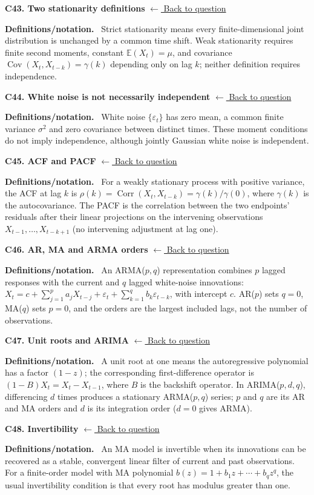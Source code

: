 \documentclass[11pt,a4paper]{article}
\newcommand{\E}{\mathbb{E}}
\newenvironment{conceptanswer}[2]
  {\par\addvspace{10pt}\noindent\begin{minipage}{\linewidth}%
   \hypertarget{concept-answer:#1}{}%
   \textcolor{statblue}{\textbf{C#1. #2}}\hfill%
   {\footnotesize\hyperlink{concept-question:#1}{$\leftarrow$ Back to question}}%
   \par\smallskip\textbf{Definitions/notation.}\ }
  {\end{minipage}\par}
\begin{document}
\begin{conceptanswer}{43}{Two stationarity definitions}
Strict stationarity means every finite-dimensional joint distribution
is unchanged by a common time shift.
Weak stationarity requires finite second moments, constant
$\E(X_t)=\mu$, and covariance
$\operatorname{Cov}(X_t,X_{t-k})=\gamma(k)$ depending only on lag $k$;
neither definition requires independence.
\end{conceptanswer}

\begin{conceptanswer}{44}{White noise is not necessarily independent}
White noise $\{\varepsilon_t\}$ has zero mean, a common finite variance
$\sigma^2$ and zero covariance between distinct times.
These moment conditions do not imply independence, although jointly
Gaussian white noise is independent.
\end{conceptanswer}

\begin{conceptanswer}{45}{ACF and PACF}
For a weakly stationary process with positive variance, the ACF at
lag $k$ is $\rho(k)=\operatorname{Corr}(X_t,X_{t-k})=\gamma(k)/\gamma(0)$,
where $\gamma(k)$ is the autocovariance.
The PACF is the correlation between the two endpoints' residuals
after their linear projections on the intervening observations
$X_{t-1},\ldots,X_{t-k+1}$ (no intervening adjustment at lag one).
\end{conceptanswer}

\begin{conceptanswer}{46}{AR, MA and ARMA orders}
An ARMA($p,q$) representation combines $p$ lagged responses with
the current and $q$ lagged white-noise innovations:
$X_t=c+\sum_{j=1}^p a_jX_{t-j}+\varepsilon_t+
\sum_{k=1}^q b_k\varepsilon_{t-k}$, with intercept $c$.
AR($p$) sets $q=0$, MA($q$) sets $p=0$, and the orders are the
largest included lags, not the number of observations.
\end{conceptanswer}

\begin{conceptanswer}{47}{Unit roots and ARIMA}
A unit root at one means the autoregressive polynomial has a factor
$(1-z)$; the corresponding first-difference operator is
$(1-B)X_t=X_t-X_{t-1}$, where $B$ is the backshift operator.
In ARIMA($p,d,q$), differencing $d$ times produces a stationary
ARMA($p,q$) series; $p$ and $q$ are its AR and MA orders and
$d$ is its integration order ($d=0$ gives ARMA).
\end{conceptanswer}

\begin{conceptanswer}{48}{Invertibility}
An MA model is invertible when its innovations can be recovered as a
stable, convergent linear filter of current and past observations.
For a finite-order model with MA polynomial
$b(z)=1+b_1z+\cdots+b_qz^q$, the usual invertibility condition is
that every root has modulus greater than one.
\end{conceptanswer}
\end{document}
